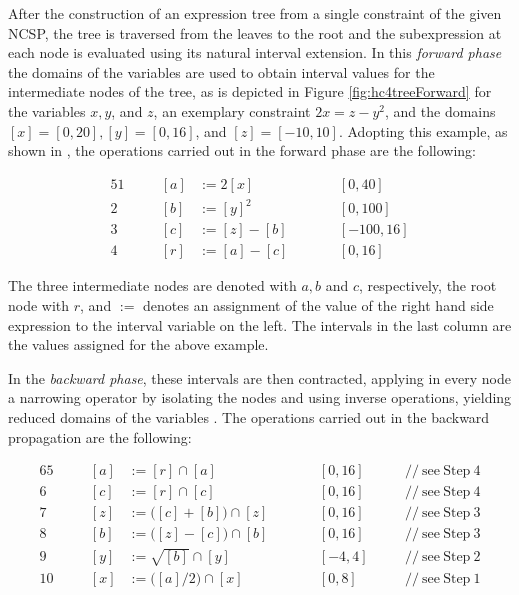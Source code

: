 After the construction of an expression tree from a single constraint of the given NCSP, the tree is traversed from the leaves to the root and the subexpression at each node is evaluated using its natural interval extension. In this \emph{forward phase} the domains of the variables are used to obtain interval values for the intermediate nodes of the tree, as is depicted in Figure \ref{fig:hc4treeForward} for the variables $x, y$, and $z$, an exemplary constraint $2 x = z - y^2$, and the domains $[x] = [0, 20], [y] = [0, 16]$, and $[z] = [-10, 10]$. Adopting this example, as shown in \cite{jaulin2012introbotics}, the operations carried out in the forward phase are the following:


\begin{alignat*}{5}
	1 & \quad  & [a] &:= 2 [x]              && [0, 40]    \\
	2 &        & [b] &:= [y]^2		   	    && [0, 100]   \\
	3 &        & [c] &:= [z] - [b]          && [-100, 16] \\
	4 &        & [r] &:= [a] - [c] \qquad   && [0, 16]
	\end{alignat*}
	
	
\noindent
The three intermediate nodes are denoted with $a, b$ and $c$, respectively, the root node with $r$, and $:=$ denotes an assignment of the value of the right hand side expression to the interval variable on the left. The intervals in the last column are the values assigned for the above example.

In the \emph{backward phase}, these intervals are then contracted, applying in every node a narrowing operator by isolating the nodes and using inverse operations, yielding reduced domains of the variables \cite{garajova2016solving}. The operations carried out in the backward propagation are the following:

	\begin{alignat*}{6}
	5 &  \quad & [a] &:= [r] \cap [a] 	     		  && [0, 16]  \quad && \mathrm{//\:see\:Step} \: 4 \\
	6 &        & [c] &:= [r] \cap [c] 	     		  && [0, 16]  \quad && \mathrm{//\:see\:Step} \: 4 \\
	7 & 	   & [z] &:= \big([c] + [b]\big) \cap [z] && [0, 16]  \quad && \mathrm{//\:see\:Step} \: 3 \\
	8 &        & [b] &:= \big([z] - [c]\big) \cap [b] \qquad && [0, 16]   \quad && \mathrm{//\:see\:Step} \: 3 \\
	9 &       & [y] &:= \sqrt{[b]} \cap [y]   && [-4, 4] \quad && \mathrm{//\:see\:Step} \: 2 \\
	10 &        & [x] &:= \big([a] / 2\big) \cap [x]   && [0, 8]   \quad && \mathrm{//\:see\:Step} \: 1     
	\end{alignat*}


